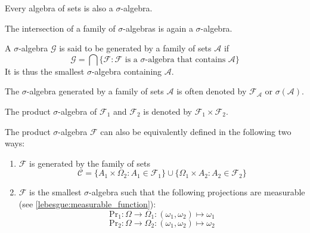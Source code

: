 	\begin{result}
		Every algebra of sets is also a $\sigma$-algebra.
	\end{result}
    
    \begin{property}
		The intersection of a family of $\sigma$-algebras is again a $\sigma$-algebra.
	\end{property}
    
    \begin{definition}
		A $\sigma$-algebra $\mathcal{G}$ is said to be generated by a family of sets $\mathcal{A}$ if
        \begin{equation}
			\label{set:generated_sigma_algebra}
            \mathcal{G} = \bigcap\{\mathcal{F}:\mathcal{F} \text{ is a } \sigma\text{-algebra that contains } \mathcal{A}\}
		\end{equation}
        It is thus the smallest $\sigma$-algebra containing $\mathcal{A}$.
	\end{definition}
    \begin{notation}
    	\label{set:notation:generated_sigma_algebra}
		The $\sigma$-algebra generated by a family of sets $\mathcal{A}$ is often denoted by $\mathcal{F}_\mathcal{A}$ or $\sigma(\mathcal{A})$.
	\end{notation}
    

	\begin{notation}
		The product $\sigma$-algebra of $\mathcal{F}_1$ and $\mathcal{F}_2$ is denoted by $\mathcal{F}_1\times\mathcal{F}_2$.
	\end{notation}
    
    \begin{adefinition}
		The product $\sigma$-algebra $\mathcal{F}$ can also be equivalently defined in the following two ways:
        \begin{enumerate}
			\item $\mathcal{F}$ is generated by the family of sets
            \[
            	\mathcal{C} = \{A_1\times \Omega_2:A_1\in\mathcal{F}_1\}\cup\{\Omega_1\times A_2:A_2\in\mathcal{F}_2\}
            \]
            \item $\mathcal{F}$ is the smallest $\sigma$-algebra such that the following projections are measurable (see \ref{lebesgue:measurable_function}):
            \[
            	\text{Pr}_1:\Omega\rightarrow\Omega_1:(\omega_1,\omega_2)\mapsto\omega_1
            \]
            \[
            	\text{Pr}_2:\Omega\rightarrow\Omega_2:(\omega_1,\omega_2)\mapsto\omega_2
            \]
		\end{enumerate}
	\end{adefinition}
    
